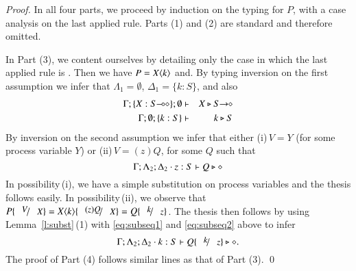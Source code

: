 \begin{proof}
	In all four parts, we proceed by induction on the typing for $P$,
	with a case analysis on the last applied rule. 
	Parts (1) and (2) are standard and therefore omitted. 

	In Part (3), we content ourselves by detailing only the case in
	which the last applied rule is . 
	Then we have $P = X\langle k \rangle$ and. By typing inversion on the first assumption we infer that
	$\Lambda_1 = \emptyset$, $\Delta_1 = \{k : S\}$, and also
%
	\begin{eqnarray}
		\Gamma; \{X : \lhot{S} \} ; \emptyset & \proves &  X \hastype \shot{S} \nonumber \\
		\Gamma; \emptyset; \{k : S\} & \proves & k \hastype S  \label{eq:subseq1}
	\end{eqnarray}
%
	By inversion on the second assumption we infer that either
	(i)\,$V = Y$ (for some process variable $Y$) or 
	(ii)\,$V = (z)Q$, for some $Q$ such that
%
	\begin{equation}
		\Gamma; \Lambda_2 ; \Delta_2 \cdot z:S  \vdash Q \triangleright \diamond \label{eq:subseq2}\\
	\end{equation}
%
	In possibility\,(i), we have a simple substitution on process variables and the thesis follows easily. 
	In possibility\,(ii), we observe that $P\subst{V}{X} = \appl{X}{k}\subst{(z)Q}{X} = Q\subst{k}{z}$.
	The thesis then follows by using Lemma~\ref{l:subst}\,(1) with \eqref{eq:subseq1} and \eqref{eq:subseq2} above to infer 
%
	\begin{equation*}
		\Gamma; \Lambda_2 ; \Delta_2 \cat k:S  \proves Q \subst{k}{z} \hastype \Proc .
	\end{equation*}
%
	The proof of Part (4) follows similar lines as that of Part (3).
	\qed
\end{proof}

%

